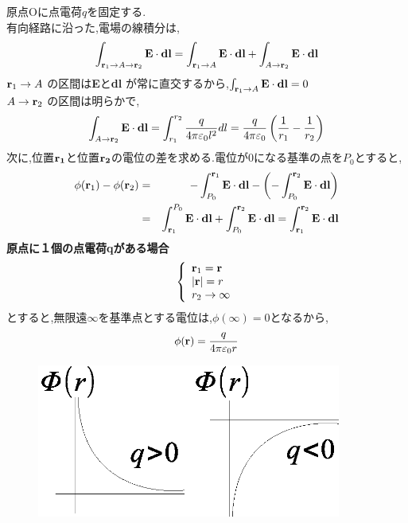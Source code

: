 \documentclass[../main]{subfiles}
\begin{document}
原点Oに点電荷$q$を固定する. \\
有向経路に沿った,電場の線積分は,
\begin{eqnarray}
\int_{{\bf r}_1 \to A \to {\bf r}_2}^{} {\bf E} \cdot {\bf dl} = \int_{{\bf r}_1 \to A}^{} {\bf E} \cdot {\bf dl} + \int_{A \to {\bf r}_2}^{} {\bf E} \cdot {\bf dl}
\end{eqnarray}
${\bf r}_1 \to A$ の区間は{\bf E}と{\bf dl} が常に直交するから,$\int_{{\bf r}_1 \to A}^{} {\bf E} \cdot {\bf dl} = 0$ \\
$A \to {\bf r}_2$ の区間は明らかで,
\begin{eqnarray}
\int_{A \to {\bf r}_2}^{} {\bf E} \cdot {\bf dl} = \int_{r_1}^{r_2} \frac{q}{4 \pi \varepsilon_0 l^2} dl = \frac{q}{4 \pi \varepsilon_0} \left( \frac{1}{r_1}-\frac{1}{r_2} \right)
\end{eqnarray}
次に,位置${\bf r_1}$と位置${\bf r_2}$の電位の差を求める.電位が0になる基準の点を$P_0$とすると,
\begin{eqnarray}
 \phi ({\bf r}_1) - \phi ({\bf r}_2) &=& - \int_{P_0}^{{\bf r}_1} {\bf E} \cdot {\bf dl} - \left( -\int_{P_0}^{{\bf r}_2} {\bf E} \cdot {\bf dl} \right) \\
&=& \int_{{\bf r}_1}^{P_0} {\bf E} \cdot {\bf dl} + \int_{P_0}^{{\bf r}_2} {\bf E} \cdot {\bf dl} 
= \int_{{\bf r}_1}^{{\bf r}_2} {\bf E} \cdot {\bf dl} 
\end{eqnarray}
{\bf 原点に１個の点電荷qがある場合} \\
\begin{eqnarray}
\left \{
\begin{array}{l}
{\bf r}_1 = {\bf r} \\
|{\bf r}|=r \\
r_2 \to \infty 
\end{array}
\right.
\end{eqnarray}
とすると,無限遠$\infty$を基準点とする電位は,$\phi(\infty)=0$となるから,
\begin{eqnarray}
\phi ({\bf r}) = \frac{q}{4 \pi \varepsilon_0 r}
\end{eqnarray}
\begin{figure}[htbp]
 \begin{center}
  \includegraphics[width=100mm]{5.6.eps}
 \end{center}
 \caption{}
 \label{fig:six}
\end{figure}
\end{document}
